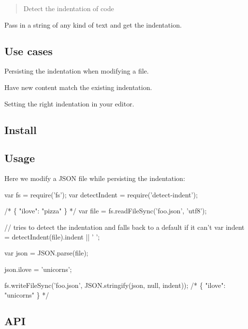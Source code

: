 \begin{quote}
Detect the indentation of code \end{quote}


Pass in a string of any kind of text and get the indentation.

\subsection*{Use cases}


\begin{DoxyItemize}
\item Persisting the indentation when modifying a file.
\item Have new content match the existing indentation.
\item Setting the right indentation in your editor.
\end{DoxyItemize}

\subsection*{Install}




\subsection*{Usage}

Here we modify a J\+S\+ON file while persisting the indentation\+:


\begin{DoxyCode}
var fs = require('fs');
var detectIndent = require('detect-indent');

/*
\{
    "ilove": "pizza"
\}
*/
var file = fs.readFileSync('foo.json', 'utf8');

// tries to detect the indentation and falls back to a default if it can't
var indent = detectIndent(file).indent || '    ';

var json = JSON.parse(file);

json.ilove = 'unicorns';

fs.writeFileSync('foo.json', JSON.stringify(json, null, indent));
/*
\{
    "ilove": "unicorns"
\}
*/
\end{DoxyCode}


\subsection*{A\+PI}


